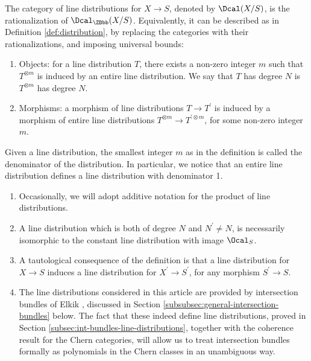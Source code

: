 \begin{definition}\label{def:Q-distribution}
The category of line distributions for $X\to S$, denoted by $\Dcal(X/S)$, is the rationalization of $\Dcal_{\ZBbb}(X/S)$. Equivalently, it can be described as in Definition \ref{def:distribution}, by replacing the categories with their rationalizations, and imposing universal bounds:
\begin{enumerate}
\item Objects: for a line distribution $T$, there exists a non-zero integer $m$ such that $T^{\otimes m}$ is induced by an entire line distribution. We say that $T$ has degree $N$ is $T^{\otimes m}$ has degree $N$.
\item Morphisms: a morphism of line distributions $T\to T^{\prime}$ is induced by a morphism of entire line distributions $T^{\otimes m}\to T^{\prime\otimes m} $, for some non-zero integer $m$.
\end{enumerate}
\end{definition}
Given a line distribution, the smallest integer $m$ as in the definition is called the denominator of the distribution. In particular, we notice that an entire line distribution defines a line distribution with denominator 1.\enlargethispage{.5\baselineskip}%

\skpt
\begin{remark}
\begin{enumerate}
\item Occasionally, we will adopt additive notation for the product of line distributions.
\item A line distribution which is both of degree $N$ and $N^{\prime}\neq N$, is necessarily isomorphic to the constant line distribution with image $\Ocal_{S}$.
\item A tautological consequence of the definition is that a line distribution for \hbox{$X\!\to\! S$} induces a line distribution for $X^{\prime}\to S^{\prime}$, for any morphism $S^{\prime}\to S$.
\item The line distributions considered in this article are provided by intersection bundles of Elkik \cite{Elkikfib}, discussed in Section \ref{subsubsec:general-intersection-bundles} below. The fact that these indeed define line distributions, proved in Section \ref{subsec:int-bundles-line-distributions}, together with the coherence result for the Chern categories, will allow us to treat intersection bundles formally as polynomials in the Chern classes in an unambiguous way.
\end{enumerate}
\end{remark}

